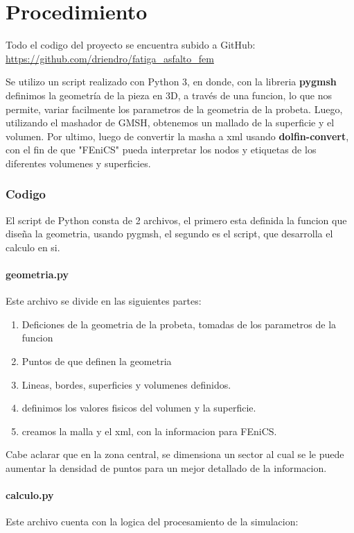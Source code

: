 \documentclass[12pt, a4paper]{article}
\begin{document}
\section{Procedimiento}

Todo el codigo del proyecto se encuentra subido a GitHub: \url{https://github.com/driendro/fatiga_asfalto_fem}

Se utilizo un script realizado con Python 3, en donde, con la libreria \textbf{pygmsh} definimos la geometría de la pieza en 3D, a través de una funcion, lo que nos permite, variar facilmente los parametros de la geometria de la probeta. Luego, utilizando el mashador de GMSH, obtenemos un mallado de la superficie y el volumen. Por ultimo, luego de convertir la masha a xml usando \textbf{dolfin-convert}, con el fin de que "FEniCS" pueda interpretar los nodos y etiquetas de los diferentes volumenes y superficies.

\subsubsection{Codigo}

El script de Python consta de 2 archivos, el primero esta definida la funcion que diseña la geometria, usando pygmsh, el segundo es el script, que desarrolla el calculo en si.

\paragraph{geometria.py} Este archivo se divide en las siguientes partes:

\begin{enumerate}
	\item Deficiones de la geometria de la probeta, tomadas de los parametros de la funcion
	\item Puntos de que definen la geometria
	\item Lineas, bordes, superficies y volumenes definidos.
	\item definimos los valores fisicos del volumen y la superficie.
	\item creamos la malla y el xml, con la informacion para FEniCS. 
\end{enumerate}

Cabe aclarar que en la zona central, se dimensiona un sector al cual se le puede aumentar la densidad de puntos para un mejor detallado de la informacion.

\paragraph{calculo.py} Este archivo cuenta con la logica del procesamiento de la simulacion:
\end{document}
